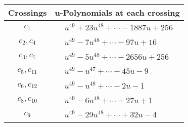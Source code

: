 \documentclass[1p]{elsarticle_modified}
\theoremstyle{definition}
\begin{document}
\begin{tabular}{m{50pt}|m{274pt}}
Crossings & \hspace{64pt}u-Polynomials at each crossing \\
\hline $$\begin{aligned}c_{1}\end{aligned}$$&$\begin{aligned}
&u^{49}+23 u^{48}+\cdots-1887 u+256
\end{aligned}$\\
\hline $$\begin{aligned}c_{2},c_{4}\end{aligned}$$&$\begin{aligned}
&u^{49}-7 u^{48}+\cdots-97 u+16
\end{aligned}$\\
\hline $$\begin{aligned}c_{3},c_{7}\end{aligned}$$&$\begin{aligned}
&u^{49}-5 u^{48}+\cdots-2656 u+256
\end{aligned}$\\
\hline $$\begin{aligned}c_{5},c_{11}\end{aligned}$$&$\begin{aligned}
&u^{49}- u^{47}+\cdots-45 u-9
\end{aligned}$\\
\hline $$\begin{aligned}c_{6},c_{12}\end{aligned}$$&$\begin{aligned}
&u^{49}- u^{48}+\cdots+2 u-1
\end{aligned}$\\
\hline $$\begin{aligned}c_{8},c_{10}\end{aligned}$$&$\begin{aligned}
&u^{49}-6 u^{48}+\cdots+27 u+1
\end{aligned}$\\
\hline $$\begin{aligned}c_{9}\end{aligned}$$&$\begin{aligned}
&u^{49}-29 u^{48}+\cdots+32 u-4
\end{aligned}$\\
\hline
\end{tabular}\\~\\
\newpage\renewcommand{\arraystretch}{1}
\end{document}
